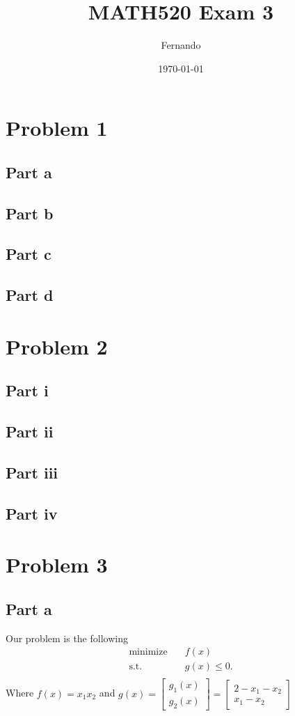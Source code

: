 \documentclass{article}
\begin{document}
\title{MATH520 Exam 3}
\author{Fernando}
\date{\today}
\maketitle

\section*{Problem 1}
\subsection*{Part a}
\subsection*{Part b}
\subsection*{Part c}
\subsection*{Part d}
\section*{Problem 2}
\subsection*{Part i}
\subsection*{Part ii}
\subsection*{Part iii}
\subsection*{Part iv}
\section*{Problem 3}
\subsection*{Part a}
Our problem is the following
\[
\begin{aligned}
\text{minimize}\quad & f(x)\\
\textrm{s.t.} \quad &g(x)\leq 0.\\
\end{aligned}
\]
Where $f(x)=x_1x_2$ and $g(x)=\begin{bmatrix}
g_1(x)\\
g_2(x)
\end{bmatrix}=\begin{bmatrix}
2-x_1-x_2\\
x_1-x_2
\end{bmatrix}$
\end{document}
